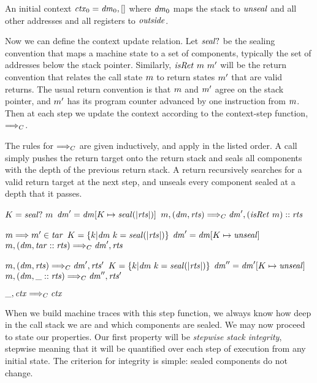 \documentclass[acmsmall,review,anonymous]{acmart}\settopmatter{printfolios=true,printccs=false,printacmref=false}
\begin{document}
An initial context \(\mathit{ctx}_0 = \mathit{dm}_0, []\) where \(\mathit{dm}_0\) maps
the stack to \(\mathit{unseal}\) and all other addresses and all registers to \(\mathit{outside}\).

Now we can define the context update relation. Let \(\mathit{seal?}\) be the sealing convention
that maps a machine state to a set of components, typically the set of addresses below
the stack pointer. Similarly, \(\mathit{isRet} ~ m ~ m'\) will be the return convention
that relates the call state \(m\) to return states \(m'\) that are valid returns.
The usual return convention is that \(m\) and \(m'\) agree on the stack pointer,
and \(m'\) has its program counter advanced by one instruction from \(m\).
Then at each step we update the context according to the context-step function,
\(\Longrightarrow_C\).

The rules for \(\Longrightarrow_C\) are given inductively, and apply in the listed order.
A call simply pushes the return target onto the return stack and seals all components
with the depth of the previous return stack. A return
recursively searches for a valid return target at the next step, and unseals
every component sealed at a depth that it passes.

\judgmentthree[Call]
              {\(\codemap ~ (\mach ~ \PCname) = \callmap\)}
              {\(K = \mathit{seal?} ~ m\)}
              {\(\mathit{dm}' = \mathit{dm}[K \mapsto \mathit{seal(|\mathit{rts}|)}]\)}
                {\(m,(\mathit{dm},\mathit{rts}) \Longrightarrow_C \mathit{dm}',(\mathit{isRet} ~ m)::\mathit{rts}\)}

\judgmenttwobr[ReturnFound]
              {\(\codemap ~ (\mach ~ \PCname) = \retmap\)}
              {\(m \Longrightarrow m' \in \mathit{tar}\)}
              {\(K = \{k | \mathit{dm} ~ k = \mathit{seal(|\mathit{rts}|)}\}\)}
              {\(\mathit{dm}' = \mathit{dm}[K \mapsto \mathit{unseal}]\)}
              {\(m,(\mathit{dm},\mathit{tar}::\mathit{rts}) \Longrightarrow_C \mathit{dm}',\mathit{rts}\)}

\judgmenttwobr[ReturnRec]
              {\(\codemap ~ (\mach ~ \PCname) = \retmap\)}
              {\(m,(\mathit{dm},\mathit{rts}) \Longrightarrow_C \mathit{dm}',\mathit{rts}'\)}
              {\(K = \{k | \mathit{dm} ~ k = \mathit{seal(|\mathit{rts}|)}\}\)}
              {\(\mathit{dm}'' = \mathit{dm}'[K \mapsto \mathit{unseal}]\)}
              {\(m,(\mathit{dm},\_::\mathit{rts}) \Longrightarrow_C \mathit{dm}'',\mathit{rts}'\)}

\judgment[Default]
         {}
         {\(\_,\mathit{ctx} \Longrightarrow_C \mathit{ctx}\)}

When we build machine traces with this step function, we always know how deep in the
call stack we are and which components are sealed. We may now proceed to state our properties.
Our first property will be {\em stepwise stack integrity}, stepwise meaning that it will be
quantified over each step of execution from any initial state. The criterion for integrity
is simple: sealed components do not change.
\end{document}
